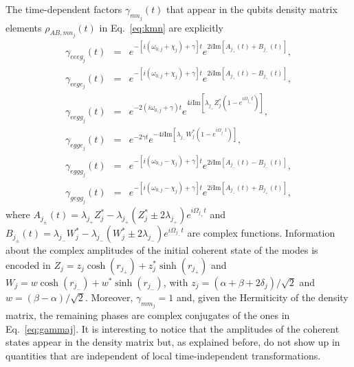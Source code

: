 \documentclass[%
reprint,
amsmath,amssymb,
aps,
pra,
]{revtex4-1}
\begin{document}
\section{}%
The time-dependent factors $\gamma_{mn_j}(t)$ that appear in the qubits density matrix elements $\rho_{AB,mn_j}(t)$  in Eq.~\eqref{eq:kmn} are explicitly 
\begin{eqnarray}
\gamma_{eeeg_j}(t)&=&e^{-\left[i\left(\omega_{0,j}+\chi_j\right)+\gamma\right]t}e^{2i\text{Im}\left[A_{j_+}(t)+B_{j_-}(t)\right]}, \nonumber \\
\gamma_{eege_j}(t)&=&e^{-\left[i\left(\omega_{0,j}+\chi_j\right)+\gamma\right]t}e^{2i\text{Im}\left[A_{j_+}(t)-B_{j_+}(t)\right]}, \nonumber \\
\gamma_{eegg_j}(t)&=&e^{-2\left(i\omega_{0,j}+\gamma\right)t}e^{4i\text{Im}\left[\lambda_{j_+}Z_{j}^{*}\left(1-e^{i\Omega_{j_+}t}\right)\right]}, \nonumber \\ 
\gamma_{egge_j}(t)&=&e^{-2\gamma t}e^{-4i\text{Im}\left[\lambda_{j_-}W_{j}^{*}\left(1-e^{i\Omega_{j_-}t}\right)\right]}, \nonumber \\
\gamma_{eggg_j}(t)&=&e^{-\left[i\left(\omega_{0,j}-\chi_j\right)+\gamma\right]t}e^{2i\text{Im}\left[A_{j_-}(t)-B_{j_-}(t)\right]}, \nonumber \\
\gamma_{gegg_j}(t)&=&e^{-\left[i\left(\omega_{0,j}-\chi_j\right)+\gamma\right]t}e^{2i\text{Im}\left[A_{j_-}(t)+B_{j_+}(t)\right]}, 
\label{eq:gammaj}
\end{eqnarray}
where $A_{j_\pm}(t)=\lambda_{j_+}Z^{*}_{j}-\lambda_{j_+}(Z^{*}_{j}\pm2\lambda_{j_+})e^{i\Omega_{j_+}t}$ and $B_{j_\pm}(t)=\lambda_{j_-}W^{*}_{j}-\lambda_{j_-}(W^{*}_{j}\pm2\lambda_{j_-})e^{i\Omega_{j_-}t}$ are complex functions. Information about the complex amplitudes of the initial coherent state of the modes is encoded in  $Z_j=z_{j}\cosh(r_{j_+})+z^{*}_{j}\sinh(r_{j_+})$ and $W_j=w\cosh(r_{j_-})+w^{*}\sinh(r_{j_-})$, with $z_j=\left(\alpha+\beta+2\delta_j\right)/\sqrt{2}$ and $w=\left(\beta-\alpha\right)/\sqrt{2}$. Moreover,  $\gamma_{mm_j}=1$  and, given the Hermiticity of the density matrix, the remaining phases are complex conjugates of the ones in Eq.~\eqref{eq:gammaj}. It is interesting to notice that the amplitudes of the coherent states appear in the density matrix but, as explained before, do not show up in quantities that are independent of local time-independent transformations.
\end{document}
